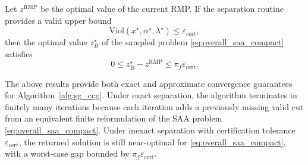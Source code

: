 \begin{theorem}
\label{prop:sg_epsopt}
Let $z^{\mathrm{RMP}}$ be the optimal value of the current RMP. If the separation routine provides a valid upper bound
\begin{equation}
\label{eq:sg_epscert}
\mathrm{Viol}(x^{\star},\alpha^{\star},\lambda^{\star})\le \varepsilon_{\mathrm{cert}},
\end{equation}
then the optimal value $z_B^{\star}$ of the sampled problem \eqref{eq:overall_saa_compact} satisfies
\begin{equation}
\label{eq:sg_epsgap}
0\le z_B^{\star}-z^{\mathrm{RMP}}\le \pi_f\varepsilon_{\mathrm{cert}}.
\end{equation}
\end{theorem}
\begin{remark}
The above results provide both exact and approximate convergence guarantees
for Algorithm~\ref{alg:sg_ccg}. Under exact separation, the algorithm terminates
in finitely many iterations because each iteration adds a previously missing
valid cut from an equivalent finite reformulation of the SAA problem
\eqref{eq:overall_saa_compact}. Under inexact separation with certification
tolerance $\varepsilon_{\mathrm{cert}}$, the returned solution is still
near-optimal for \eqref{eq:overall_saa_compact}, with a worst-case gap bounded
by $\pi_f\varepsilon_{\mathrm{cert}}$.
\end{remark}

